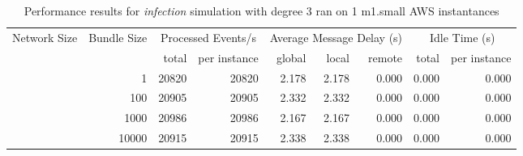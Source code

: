 \begin{table}
	  \caption[Performance results, \emph{infection:3 on 1 m1.small instances }]{ Performance results for \emph{ infection } simulation with degree 3 ran on 1 m1.small AWS instantances }
	\begin{tabular}{rrrrrrrrr}
	\hline\noalign{\smallskip}

	Network Size &
	Bundle Size &
	\multicolumn{2}{c}{Processed Events/s} & 
	\multicolumn{3}{c}{Average Message Delay (s)} & 
	\multicolumn{2}{c}{Idle Time (s)}  \\

	 & 
	 & 
	 total & per instance
     & global & local & remote
     & total & per instance\\

			
				\noalign{\smallskip}\hline
				\multirow{ 4 }{*}{ 40000 } &
				
					
					 
					\multirow{ 1 }{*}{ 1 } &
					
						
							    
							     20820  & 20820  
	                           & 2.178 & 2.178 & 0.000
	                           & 0.000 & 0.000  \\
	                
	            
					 &  
					 
					\multirow{ 1 }{*}{ 100 } &
					
						
							    
							     20905  & 20905  
	                           & 2.332 & 2.332 & 0.000
	                           & 0.000 & 0.000  \\
	                
	            
					 &  
					 
					\multirow{ 1 }{*}{ 1000 } &
					
						
							    
							     20986  & 20986  
	                           & 2.167 & 2.167 & 0.000
	                           & 0.000 & 0.000  \\
	                
	            
					 &  
					 
					\multirow{ 1 }{*}{ 10000 } &
					
						
							    
							     20915  & 20915  
	                           & 2.338 & 2.338 & 0.000
	                           & 0.000 & 0.000  \\
	                

\end{tabular}
\end{table}
